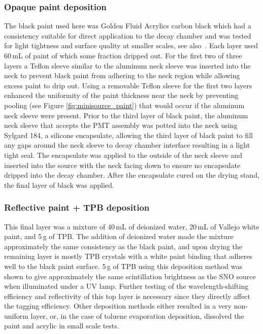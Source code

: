 \subsubsection{Opaque paint deposition}
The black paint used here was Golden Fluid Acrylics carbon black which had a consistency suitable for direct application to the decay chamber and was tested for light tightness and surface quality at smaller scales, see also~\cite{tanner:2014}. Each layer used 60\,mL of paint of which some fraction dripped out. For the first two of three layers a Teflon sleeve similar to the aluminum neck sleeve was inserted into the neck to prevent black paint from adhering to the neck region while allowing excess paint to drip out. Using a removable Teflon sleeve for the first two layers enhanced the uniformity of the paint thickness near the neck by preventing pooling (see Figure \ref{fig:minisource_paint}) that would occur if the aluminum neck sleeve were present. Prior to the third layer of black paint, the aluminum neck sleeve that accepts the PMT assembly was potted into the neck using Sylgard 184, a silicone encapsulate, allowing the third layer of black paint to fill any gaps around the neck sleeve to decay chamber interface resulting in a light tight seal. The encapsulate was applied to the outside of the neck sleeve and inserted into the source with the neck facing down to ensure no encapsulate dripped into the decay chamber. After the encapsulate cured on the drying stand, the final layer of black was applied.

\subsubsection{Reflective paint + TPB deposition}
This final layer was a mixture of 40\,mL of deionized water, 20\,mL of Vallejo white paint, and 5\,g of TPB. The addition of deionized water made the mixture approximately the same consistency as the black paint, and upon drying the remaining layer is mostly TPB crystals with a white paint binding that adheres well to the black paint surface. 5\,g of TPB using this deposition method was shown to give approximately the same scintillation brightness as the SNO \Li source when illuminated under a UV lamp. Further testing of the wavelength-shifting efficiency and reflectivity of this top layer is necessary since they directly affect the tagging efficiency. Other deposition methods either resulted in a very non-uniform layer, or, in the case of toluene evaporation deposition, dissolved the paint and acrylic in small scale tests.

